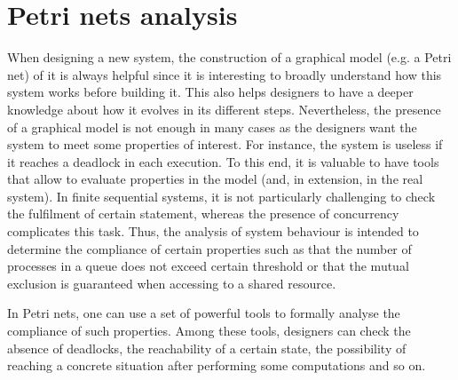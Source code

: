 %
%

\section{Petri nets analysis}
When designing a new system, the construction of a graphical model (e.g. a Petri net) of it is always
helpful since it is interesting to broadly understand how this system works before building it. This also helps designers to have a
deeper knowledge about how it evolves in its different steps. Nevertheless, the presence of a graphical model is not enough in many cases
as the designers want the system to meet some properties of interest. For instance, the system is useless
if it reaches a deadlock in each execution.  To this end, it is valuable to have tools that allow to
evaluate properties in the model (and, in extension, in the real system). In finite sequential systems, it is not particularly challenging to check
the fulfilment of certain statement, whereas the presence of concurrency complicates this task.
Thus, the analysis of system behaviour is intended to determine the compliance of 
certain properties such as that the number of processes in a queue does not exceed
certain threshold or that the mutual exclusion is guaranteed when accessing to a shared resource.

In Petri nets, one can use a set of powerful tools to formally analyse
the compliance of such properties. Among these tools, designers can check
the absence of deadlocks, the reachability of a certain
state, the possibility of reaching a concrete situation after performing some computations and so on.


